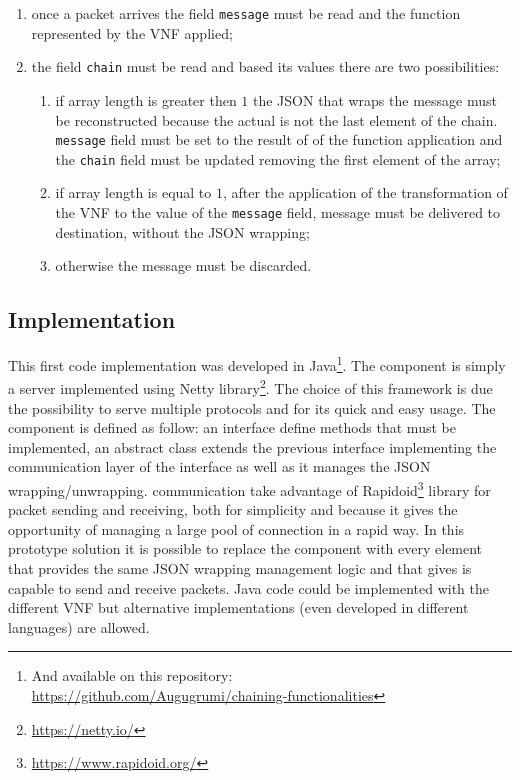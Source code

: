 \begin{enumerate}
  \item once a packet arrives the field \texttt{message} must be read and the
  function represented by the VNF applied;
  \item the field \texttt{chain} must be read and based its values there are two
  possibilities:
  \begin{enumerate}
    \item if array length is greater then $1$ the JSON that wraps the message
    must be reconstructed because the actual \vnf{} is not the last
    element of the chain. \texttt{message} field must be set to the result of
    of the function application and the \texttt{chain} field must be updated
    removing the first element of the array;
    \item if array length is equal to $1$, after the application of the
    transformation of the VNF to the value of the \texttt{message} field,
    message must be delivered to destination, without the JSON wrapping;
    \item otherwise the message must be discarded.
  \end{enumerate}
\end{enumerate}

\subsection{Implementation}
This first code implementation was developed in Java\footnote{And available on
this repository: \\\url{https://github.com/Augugrumi/chaining-functionalities}}.
The \enchainer{} component is simply a server implemented using Netty
library\footnote{\url{https://netty.io/}}. The choice of this framework is due
the possibility to serve multiple protocols and for its quick and easy usage. 
The \vnf{} component is defined as follow: an interface define methods
that must be implemented, an abstract class extends the previous interface
implementing the communication layer of the interface as well as it manages the
JSON wrapping/unwrapping. \vnf{} communication take advantage of
Rapidoid\footnote{\url{https://www.rapidoid.org/}} library for packet sending
and receiving, both for simplicity and because it gives the opportunity of
managing a large pool of connection in a rapid way. In this prototype solution
it is possible to replace the \vnf{} component with every element that
provides the same JSON wrapping management logic and that gives is capable
to send and receive packets. Java code could be implemented with the different
VNF but alternative implementations (even developed in different languages) are
allowed. 

